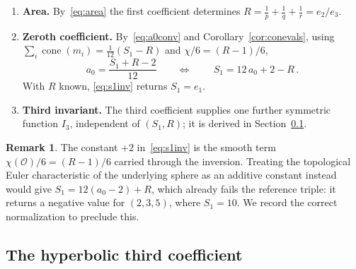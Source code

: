 \documentclass[12pt, letterpaper]{article}
\theoremstyle{definition}
\newtheorem{remark}[definition]{Remark}
\theoremstyle{plain}
\begin{document}
\begin{enumerate}[label=(\roman*)]
\item \textbf{Area.} By~\eqref{eq:area} the first coefficient determines $R=\tfrac1p+\tfrac1q+\tfrac1r=e_2/e_3$.
\item \textbf{Zeroth coefficient.} By~\eqref{eq:a0conv} and Corollary~\ref{cor:conevals}, using $\sum_i\operatorname{cone}(m_i)=\tfrac1{12}(S_1-R)$ and $\chi/6=(R-1)/6$,
\begin{equation}
    a_0=\frac{S_1+R-2}{12}\qquad\Longleftrightarrow\qquad \boxed{\,S_1=12\,a_0+2-R\,}.
    \label{eq:s1inv}
\end{equation}
With $R$ known, \eqref{eq:s1inv} returns $S_1=e_1$.
\item \textbf{Third invariant.} The third coefficient supplies one further symmetric function $I_3$, independent of $(S_1,R)$; it is derived in Section~\ref{sec:a2}.
\end{enumerate}

\begin{remark}\label{rem:bugfix}
The constant $+2$ in~\eqref{eq:s1inv} is the smooth term $\chi(\mathcal{O})/6=(R-1)/6$ carried through the inversion. Treating the topological Euler characteristic of the underlying sphere as an additive constant instead would give $S_1=12(a_0-2)+R$, which already fails the reference triple: it returns a negative value for $(2,3,5)$, where $S_1=10$. We record the correct normalization to preclude this.
\end{remark}

\subsection{The hyperbolic third coefficient}
\label{sec:a2}
\end{document}
